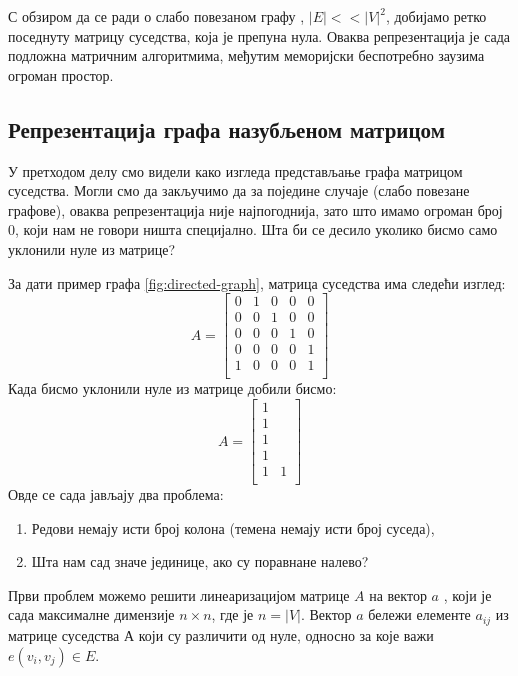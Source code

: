 \par
С обзиром да се ради о слабо повезаном графу \cite{graphs2}, $|E| << |V|^2$, добијамо ретко поседнуту матрицу суседства, која је препуна нула. Оваква репрезентација је сада подложна матричним алгоритмима, међутим меморијски беспотребно заузима огроман простор.

\subsection{Репрезентација графа назубљеном матрицом} \label{graph-as-sparse-matrix}
У претходом делу смо видели како изгледа представљање графа матрицом суседства. Могли смо да закључимо да за поједине случаје (слабо повезане графове), оваква репрезентација није најпогоднија, зато што имамо огроман број $0$, који нам не говори ништа специјално. Шта би се десило уколико бисмо само уклонили нуле из матрице?

За дати пример графа \ref{fig:directed-graph}, матрица суседства има следећи изглед:
$$
A =
\begin{bmatrix}
0 & 1 & 0 & 0 & 0 \\
0 & 0 & 1 & 0 & 0 \\
0 & 0 & 0 & 1 & 0 \\
0 & 0 & 0 & 0 & 1 \\
1 & 0 & 0 & 0 & 1 \\
\end{bmatrix}
$$
Када бисмо уклонили нуле из матрице добили бисмо:
$$
A =
\begin{bmatrix}
1 \\
1 \\
1 \\
1 \\
1 & 1 \\
\end{bmatrix}
$$
Овде се сада јављају два проблема:
\begin{enumerate}
    \item Редови немају исти број колона (темена немају исти број суседа),
    \item Шта нам сад значе јединице, ако су поравнане налево?
\end{enumerate}

\par
Први проблем можемо решити линеаризацијом матрице $A$ на вектор $a$ \cite{matrix-transformations}, који је сада максималне димензије $n \times n$, где је $n = |V|$. Вектор $a$ бележи елементе $a_{ij}$ из матрице суседства $А$ који су различити од нуле, односно за које важи $e(v_i, v_j) \in E$.

